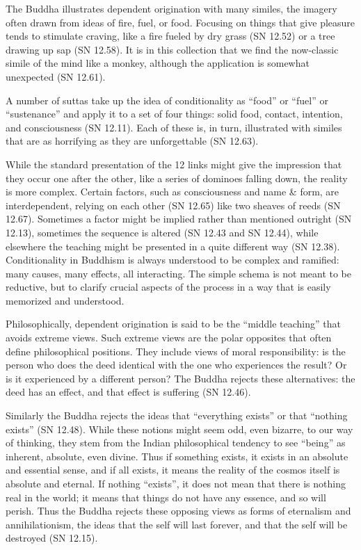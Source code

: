 \documentclass[12pt,openany]{book}%
\begin{document}
The Buddha illustrates dependent origination with many similes, the imagery often drawn from ideas of fire, fuel, or food. Focusing on things that give pleasure tends to stimulate craving, like a fire fueled by dry grass (SN 12.52) or a tree drawing up sap (SN 12.58). It is in this collection that we find the now-classic simile of the mind like a monkey, although the application is somewhat unexpected (SN 12.61).

A number of suttas take up the idea of conditionality as “food” or “fuel” or “sustenance” and apply it to a set of four things: solid food, contact, intention, and consciousness (SN 12.11). Each of these is, in turn, illustrated with similes that are as horrifying as they are unforgettable (SN 12.63).

While the standard presentation of the 12 links might give the impression that they occur one after the other, like a series of dominoes falling down, the reality is more complex. Certain factors, such as consciousness and name \& form, are interdependent, relying on each other (SN 12.65) like two sheaves of reeds (SN 12.67). Sometimes a factor might be implied rather than mentioned outright (SN 12.13), sometimes the sequence is altered (SN 12.43 and SN 12.44), while elsewhere the teaching might be presented in a quite different way (SN 12.38). Conditionality in Buddhism is always understood to be complex and ramified: many causes, many effects, all interacting. The simple schema is not meant to be reductive, but to clarify crucial aspects of the process in a way that is easily memorized and understood.

Philosophically, dependent origination is said to be the “middle teaching” that avoids extreme views. Such extreme views are the polar opposites that often define philosophical positions. They include views of moral responsibility: is the person who does the deed identical with the one who experiences the result? Or is it experienced by a different person? The Buddha rejects these alternatives: the deed has an effect, and that effect is suffering (SN 12.46).

Similarly the Buddha rejects the ideas that “everything exists” or that “nothing exists” (SN 12.48). While these notions might seem odd, even bizarre, to our way of thinking, they stem from the Indian philosophical tendency to see “being” as inherent, absolute, even divine. Thus if something exists, it exists in an absolute and essential sense, and if all exists, it means the reality of the cosmos itself is absolute and eternal. If nothing “exists”, it does not mean that there is nothing real in the world; it means that things do not have any essence, and so will perish. Thus the Buddha rejects these opposing views as forms of eternalism and annihilationism, the ideas that the self will last forever, and that the self will be destroyed (SN 12.15).
\end{document}
